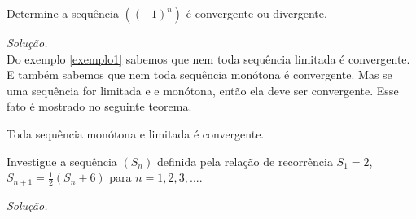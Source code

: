 \begin{ex}\label{exemplo1}
	Determine a sequência $\left( (-1)^{n}\right) $ é convergente ou divergente.
\end{ex}
\textit{Solução.}
\vspace*{2.5cm}
\\

Do exemplo \ref{exemplo1} sabemos que nem toda sequência limitada é convergente. E também sabemos que nem toda sequência monótona é convergente. Mas se uma sequência for limitada e e monótona, então ela deve ser convergente. Esse fato é mostrado no seguinte teorema.
\begin{teo} 
	Toda sequência monótona e limitada é convergente.
\end{teo}
\begin{ex}
	Investigue a sequência $\left( S_{n}\right) $ definida pela relação de recorrência $S_{1}=2$, $S_{n+1}=\frac{1}{2}(S_{n}+6)$ para $n=1,2,3,...$.
\end{ex}
\textit{Solução.}
\vspace*{10cm}

